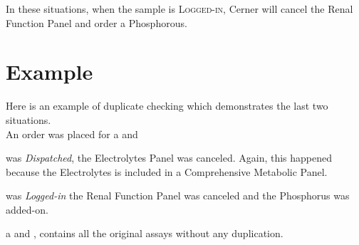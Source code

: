 In these situations, when the sample is \textsc{Logged-in}, Cerner will cancel the Renal Function Panel and order a Phosphorous.\\

\section{Example}

Here is an example of duplicate checking which demonstrates the last two situations.\\

An order was placed for a  and \\

\noindent
{}

 was \textit{Dispatched}, the Electrolytes Panel was canceled. Again, this happened because the Electrolytes is included in a Comprehensive Metabolic Panel.

 was \textit{Logged-in} the Renal Function Panel was canceled and the Phosphorus was added-on.

 a  and , contains all the original assays without any duplication.
